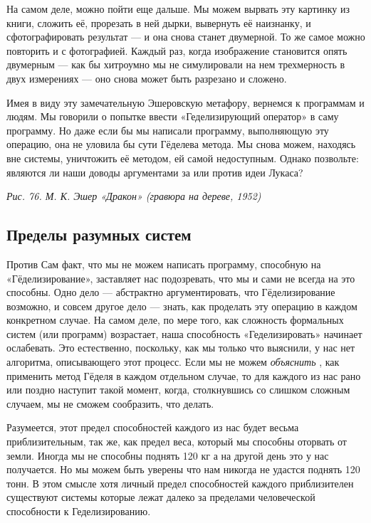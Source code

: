 \documentclass[../main.tex]{subfiles}
\begin{document}
На самом деле, можно пойти еще дальше. Мы можем вырвать эту картинку из книги, сложить её, прорезать в ней дырки, вывернуть её наизнанку, и сфотографировать результат --- и она снова станет двумерной. То же самое можно повторить и с фотографией. Каждый раз, когда изображение становится опять двумерным --- как бы хитроумно мы не симулировали на нем трехмерность в двух измерениях --- оно снова может быть разрезано и сложено.

Имея в виду эту замечательную Эшеровскую метафору, вернемся к программам и людям. Мы говорили о попытке ввести «Геделизирующий оператор» в саму программу. Но даже если бы мы написали программу, выполняющую эту операцию, она не уловила бы сути Гёделева метода. Мы снова можем, находясь вне системы, уничтожить её методом, ей самой недоступным. Однако позвольте: являются ли наши доводы аргументами за или против идеи Лукаса?

\emph{Рис. 76. М. К. Эшер «Дракон» (гравюра на дереве, 1952)}


\subsection{Пределы разумных систем}

Против Сам факт, что мы не можем написать программу, способную на «Гёделизирование», заставляет нас подозревать, что мы и сами не всегда на это способны. Одно дело --- абстрактно аргументировать, что Гёделизирование возможно, и совсем другое дело --- знать, как проделать эту операцию в каждом конкретном случае. На самом деле, по мере того, как сложность формальных систем (или программ) возрастает, наша способность «Геделизировать» начинает ослабевать. Это естественно, поскольку, как мы только что выяснили, у нас нет алгоритма, описывающего этот процесс. Если мы не можем \emph{объяснить} , как применить метод Гёделя в каждом отдельном случае, то для каждого из нас рано или поздно наступит такой момент, когда, столкнувшись со слишком сложным случаем, мы не сможем сообразить, что делать.

Разумеется, этот предел способностей каждого из нас будет весьма приблизительным, так же, как предел веса, который мы способны оторвать от земли. Иногда мы не способны поднять 120 кг а на другой день это у нас получается. Но мы можем быть уверены что нам никогда не удастся поднять 120 тонн. В этом смысле хотя личный предел способностей каждого приблизителен существуют системы которые лежат далеко за пределами человеческой способности к Геделизированию.
\end{document}
